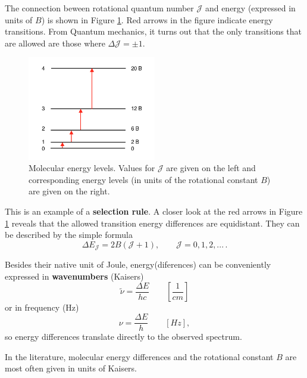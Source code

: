 The connection beween rotational quantum number $\mathcal{J}$ and
energy (expressed in units of $B$) is shown in Figure
\ref{fig:energy_levels}. Red arrows in the figure indicate energy
transitions.  From Quantum mechanics, it turns out that the only
transitions that are allowed are those where
$\Delta \mathcal{J} = \pm1$. 

\begin{figure}
\begin{center}
\includegraphics[width=0.5\textwidth]{figures/Energy_levels}
\caption{Molecular energy levels. Values for $\mathcal{J}$ are given on the left and corresponding energy
  levels (in units of the rotational constant $B$) are given on the right.}
\label{fig:energy_levels}
\end{center}
\end{figure}

This is an example of a \textbf{selection rule}. A closer look at the
red arrows in Figure \ref{fig:energy_levels} reveals that the allowed
transition energy differences are equidistant. They can be described
by the simple formula
\begin{equation}
\Delta E_\mathcal{J} = 2B(\mathcal{J}+1), \qquad \mathcal{J} = 0, 1, 2, ...\,.
\end{equation}

Besides their native unit of Joule,
energy(diferences) can be conveniently expressed in
\textbf{wavenumbers} (Kaisers)
\begin{equation}
\tilde{\nu} = \frac{\Delta E}{hc} \qquad \left[\frac{1}{cm}\right]
\end{equation}
or in frequency (Hz)
\begin{equation}
\nu = \frac{\Delta E}{h} \qquad \left[Hz\right],
\end{equation}
so energy differences translate directly to the observed spectrum.

In the literature, molecular energy differences and the rotational
constant $B$ are most often given in
units of Kaisers.

